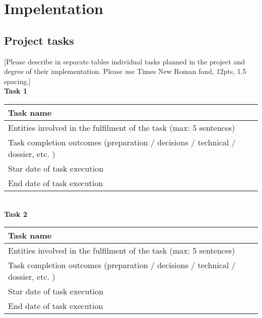 \chapter{Impelentation}\label{ch:impelentation}

\section{Project tasks}\label{sec:project-tasks}
[Please describe in separate tables individual tasks planned in the project and degree of their implementation.
Please use Times New Roman fond, 12pts, 1.5 spacing.] \\

\textbf{Task 1} \\

\begin{tabular}{|p{5cm}|p{7cm}|}
    \hline
    Task name                                                                            & \\
    \hline
    Entities involved in the fulfilment of the task (max: 5 sentences)                   & \\
    \hline
    Task completion outcomes (preparation / decisions / technical / dossier, etc. )      & \\
    \hline
    Star date of task execution                                                          & \\
    \hline
    End date of task execution                                                           & \\
    \hline
\end{tabular} \\

\textbf{Task 2} \\

\begin{tabular}{|p{5cm}|p{7cm}|}
    \hline
    Task name                                                                            & \\
    \hline
    Entities involved in the fulfilment of the task (max: 5 sentences)                   & \\
    \hline
    Task completion outcomes (preparation / decisions / technical / dossier, etc. )      & \\
    \hline
    Star date of task execution                                                          & \\
    \hline
    End date of task execution                                                           & \\
    \hline
\end{tabular}

